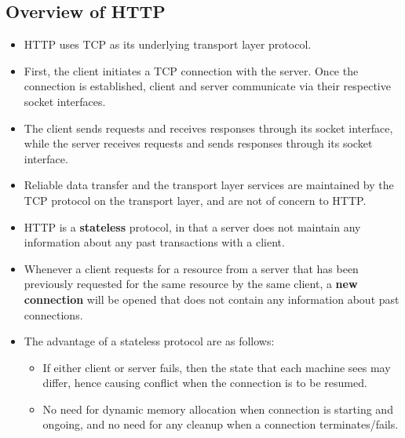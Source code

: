 \documentclass{article}
\theoremstyle{plain}
\theoremstyle{definition}
\begin{document}
\subsection{Overview of HTTP}
\begin{itemize}
    \item HTTP uses TCP as its underlying transport layer protocol. 
    
    \item First, the client initiates a TCP connection with the server. Once the connection is established, client and server communicate via their respective socket interfaces. 
    
    \item The client sends requests and receives responses through its socket interface, while the server receives requests and sends responses through its socket interface.
    
    \item Reliable data transfer and the transport layer services are maintained by the TCP protocol on the transport layer, and are not of concern to HTTP.
    
    \item HTTP is a \textbf{stateless} protocol, in that a server does not maintain any information about any past transactions with a client.
    
    \item Whenever a client requests for a resource from a server that has been previously requested for the same resource by the same client, a \textbf{new connection} will be opened that does not contain any information about past connections.
    
    \item The advantage of a stateless protocol are as follows:
    \begin{itemize}
        \item If either client or server fails, then the state that each machine sees may differ, hence causing conflict when the connection is to be resumed.
        
        \item No need for dynamic memory allocation when connection is starting and ongoing, and no need for any cleanup when a connection terminates/fails.
    \end{itemize}

\end{itemize}
\end{document}
